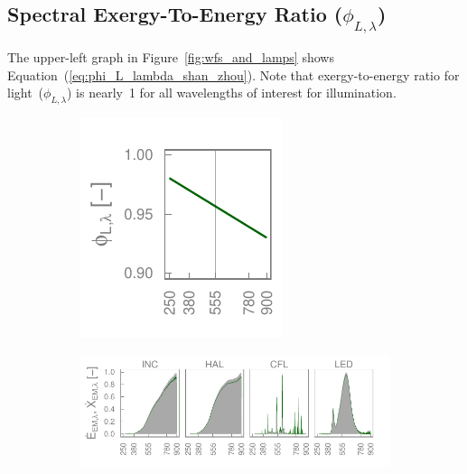 \documentclass[energies,article,accept,moreauthors,pdftex]{Definitions/mdpi}\usepackage[]{graphicx}\usepackage[]{color}
\makeatletter
\def\maxwidth{ %
  \ifdim\Gin@nat@width>\linewidth
    \linewidth
  \else
    \Gin@nat@width
  \fi
}
\newenvironment{knitrout}{}{} %
\makeatother
\begin{document}
\subsection{Spectral Exergy-To-Energy Ratio ($\phi_{L,\lambda}$)}
\label{sec:results_phi_L_lambda}

The upper-left graph in Figure~\ref{fig:wfs_and_lamps} shows 
Equation~(\ref{eq:phi_L_lambda_shan_zhou}).
Note that  exergy-to-energy  ratio for light~($\phi_{L,\lambda}$) is
nearly~1 for all wavelengths of interest for illumination.

\begin{figure}[H]
    \centering
    \begin{subfigure}[t]{0.25\textwidth}
\begin{knitrout}
\color{fgcolor}
\includegraphics[width=\maxwidth]{figure/phi_L_lambda_vs_lambda-1} 

\end{knitrout}
      \label{fig:phi_light_graph}
    \end{subfigure}
    \begin{subfigure}[t]{0.74\textwidth}
\begin{knitrout}
\color{fgcolor}

\hfill{}\includegraphics[width=\maxwidth]{figure/Energy_and_exergy_graph-1} 




\end{knitrout}
\end{subfigure}
\end{figure}
\end{document}

